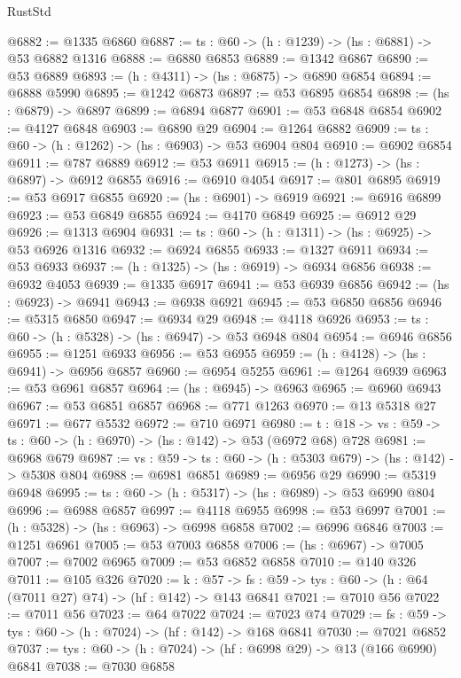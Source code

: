 \begin{lexlean}{RustStd}
\begin{coremodule}
@6882 := @1335 @6860
@6887 := {ts : @60} -> (h : @1239) -> (hs : @6881) -> @53 @6882 @1316
@6888 := @6880 @6853
@6889 := @1342 @6867
@6890 := @53 @6889
@6893 := (h : @4311) -> (hs : @6875) -> @6890 @6854
@6894 := @6888 @5990
@6895 := @1242 @6873
@6897 := @53 @6895 @6854
@6898 := (hs : @6879) -> @6897
@6899 := @6894 @6877
@6901 := @53 @6848 @6854
@6902 := @4127 @6848
@6903 := @6890 @29
@6904 := @1264 @6882
@6909 := {ts : @60} -> (h : @1262) -> (hs : @6903) -> @53 @6904 @804
@6910 := @6902 @6854
@6911 := @787 @6889
@6912 := @53 @6911
@6915 := (h : @1273) -> (hs : @6897) -> @6912 @6855
@6916 := @6910 @4054
@6917 := @801 @6895
@6919 := @53 @6917 @6855
@6920 := (hs : @6901) -> @6919
@6921 := @6916 @6899
@6923 := @53 @6849 @6855
@6924 := @4170 @6849
@6925 := @6912 @29
@6926 := @1313 @6904
@6931 := {ts : @60} -> (h : @1311) -> (hs : @6925) -> @53 @6926 @1316
@6932 := @6924 @6855
@6933 := @1327 @6911
@6934 := @53 @6933
@6937 := (h : @1325) -> (hs : @6919) -> @6934 @6856
@6938 := @6932 @4053
@6939 := @1335 @6917
@6941 := @53 @6939 @6856
@6942 := (hs : @6923) -> @6941
@6943 := @6938 @6921
@6945 := @53 @6850 @6856
@6946 := @5315 @6850
@6947 := @6934 @29
@6948 := @4118 @6926
@6953 := {ts : @60} -> (h : @5328) -> (hs : @6947) -> @53 @6948 @804
@6954 := @6946 @6856
@6955 := @1251 @6933
@6956 := @53 @6955
@6959 := (h : @4128) -> (hs : @6941) -> @6956 @6857
@6960 := @6954 @5255
@6961 := @1264 @6939
@6963 := @53 @6961 @6857
@6964 := (hs : @6945) -> @6963
@6965 := @6960 @6943
@6967 := @53 @6851 @6857
@6968 := @771 @1263
@6970 := @13 @5318 @27
@6971 := @677 @5532
@6972 := @710 @6971
@6980 := {t : @18} -> {vs : @59} -> {ts : @60} -> (h : @6970) -> (hs : @142) -> @53 (@6972 @68) @728
@6981 := @6968 @679
@6987 := {vs : @59} -> {ts : @60} -> (h : @5303 @679) -> (hs : @142) -> @5308 @804
@6988 := @6981 @6851
@6989 := @6956 @29
@6990 := @5319 @6948
@6995 := {ts : @60} -> (h : @5317) -> (hs : @6989) -> @53 @6990 @804
@6996 := @6988 @6857
@6997 := @4118 @6955
@6998 := @53 @6997
@7001 := (h : @5328) -> (hs : @6963) -> @6998 @6858
@7002 := @6996 @6846
@7003 := @1251 @6961
@7005 := @53 @7003 @6858
@7006 := (hs : @6967) -> @7005
@7007 := @7002 @6965
@7009 := @53 @6852 @6858
@7010 := @140 @326
@7011 := @105 @326
@7020 := {k : @57} ->
  {fs : @59} -> {tys : @60} -> (h : @64 (@7011 @27) @74) -> (hf : @142) -> @143 @6841
@7021 := @7010 @56
@7022 := @7011 @56
@7023 := @64 @7022
@7024 := @7023 @74
@7029 := {fs : @59} -> {tys : @60} -> (h : @7024) -> (hf : @142) -> @168 @6841
@7030 := @7021 @6852
@7037 := {tys : @60} -> (h : @7024) -> (hf : @6998 @29) -> @13 (@166 @6990) @6841
@7038 := @7030 @6858

\end{coremodule}
\end{lexlean}
